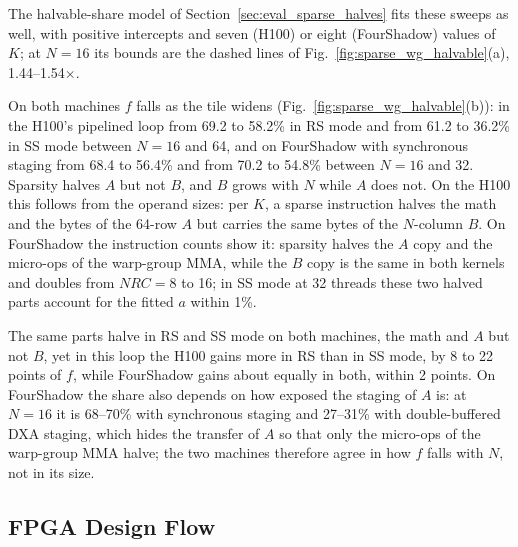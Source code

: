 The halvable-share model of Section~\ref{sec:eval_sparse_halves} fits these sweeps as well, with positive intercepts and seven (H100) or eight (FourShadow) values of $K$; at $N{=}16$ its bounds are the dashed lines of Fig.~\ref{fig:sparse_wg_halvable}(a), 1.44--1.54$\times$.

On both machines $f$ falls as the tile widens (Fig.~\ref{fig:sparse_wg_halvable}(b)): in the H100's pipelined loop from 69.2 to 58.2\% in RS mode and from 61.2 to 36.2\% in SS mode between $N{=}16$ and 64, and on FourShadow with synchronous staging from 68.4 to 56.4\% and from 70.2 to 54.8\% between $N{=}16$ and 32. Sparsity halves $A$ but not $B$, and $B$ grows with $N$ while $A$ does not. On the H100 this follows from the operand sizes: per $K$, a sparse instruction halves the math and the bytes of the 64-row $A$ but carries the same bytes of the $N$-column $B$. On FourShadow the instruction counts show it: sparsity halves the $A$ copy and the micro-ops of the warp-group MMA, while the $B$ copy is the same in both kernels and doubles from $\mathit{NRC}{=}8$ to 16; in SS mode at 32 threads these two halved parts account for the fitted $a$ within 1\%.

The same parts halve in RS and SS mode on both machines, the math and $A$ but not $B$, yet in this loop the H100 gains more in RS than in SS mode, by 8 to 22 points of $f$, while FourShadow gains about equally in both, within 2 points. On FourShadow the share also depends on how exposed the staging of $A$ is: at $N{=}16$ it is 68--70\% with synchronous staging and 27--31\% with double-buffered DXA staging, which hides the transfer of $A$ so that only the micro-ops of the warp-group MMA halve; the two machines therefore agree in how $f$ falls with $N$, not in its size.


\subsection{FPGA Design Flow}\label{sec:eval_fpga}


